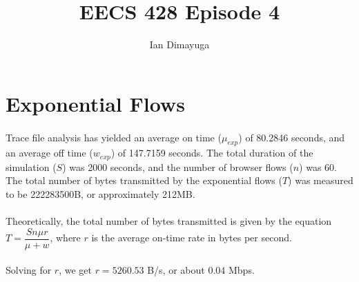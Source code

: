 \documentclass{article}
\begin{document}
\title{EECS 428 Episode 4}
\author{Ian Dimayuga}
\maketitle
\section{Exponential Flows}

\paragraph{}
Trace file analysis has yielded an average on time ($\mu_{exp}$) of 80.2846 seconds, and an average off time ($w_{exp}$) of 147.7159 seconds.
The total duration of the simulation ($S$) was 2000 seconds, and the number of browser flows ($n$) was 60.
The total number of bytes transmitted by the exponential flows ($T$) was measured to be 222283500B, or approximately 212MB.

\paragraph{}
Theoretically, the total number of bytes transmitted is given by the equation $T = \dfrac{S n \mu r}{\mu + w}$, where $r$ is the average on-time rate in bytes per second.

\paragraph{}
Solving for $r$, we get $r = 5260.53$ B/s, or about $0.04$ Mbps.
\end{document}
